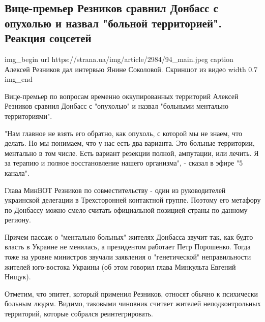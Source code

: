  
 
 

\subsection{Вице-премьер Резников сравнил Донбасс с опухолью и назвал "больной территорией". Реакция соцсетей}


\ifcmt
img_begin 
	url https://strana.ua/img/article/2984/94_main.jpeg
	caption Алексей Резников дал интервью Янине Соколовой. Скриншот из видео 
	width 0.7
img_end
\fi

Вице-премьер по вопросам временно оккупированных территорий Алексей Резников
сравнил Донбасс с "опухолью" и назвал "больными ментально территориями".

"Нам главное не взять его обратно, как опухоль, с которой мы не знаем, что
делать. Но мы понимаем, что у нас есть два варианта. Это больные территории,
ментально в том числе. Есть вариант резекции полной, ампутации, или лечить. Я
за терапию и полное восстановление нашего организма", - сказал в эфире "5
канала".

Глава МинВОТ Резников по совместительству - один из руководителей украинской
делегации в Трехсторонней контактной группе. Поэтому его метафору по Донбассу
можно смело считать официальной позицией страны по данному региону. 

Причем пассаж о "ментально больных" жителях Донбасса звучит так, как будто
власть в Украине не менялась, а президентом работает Петр Порошенко. Тогда тоже
на уровне министров звучали заявления о "генетической" неправильности жителей
юго-востока Украины (об этом говорил глава Минкульта Евгений Нищук). 

Отметим, что эпитет, который применил Резников, относят обычно к психически
больным людям. Видимо, таковыми чиновник считает жителей неподконтрольных
территорий, которые собрался реинтегрировать. 

